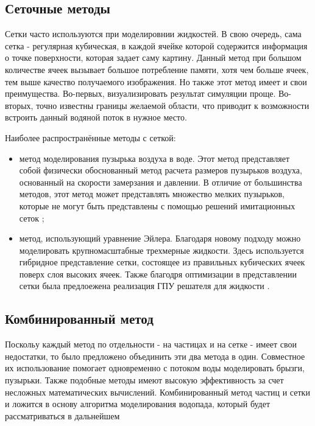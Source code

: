 \subsection{Сеточные методы}

Сетки часто используются при моделировнии жидкостей. В свою очередь, сама сетка - регулярная кубическая, в каждой ячейке которой содержится информация о точке поверхности, которая задает саму картину. Данный метод при большом количестве ячеек вызывает большое потребление памяти, хотя чем больше ячеек, тем выше качество получаемого изображения. Но также этот метод имеет и  свои преимущества. Во-первых, визуализировать результат симуляции проще. Во-вторых, точно известны границы желаемой области, что приводит к возможности встроить данный водяной поток в нужное место.

Наиболее распространённые методы с сеткой:
\begin{itemize}
    \item метод моделирования пузырька воздуха в воде. Этот метод представляет собой физически обоснованный метод расчета размеров пузырьков воздуха, основанный на скорости замерзания и давлении. В отличие от большинства методов, этот метод может представлять множество мелких пузырьков, которые не могут быть представлены с помощью решений имитационных сеток \cite{bubble-grid};

    \item метод, использующий уравнение Эйлера. Благодаря новому подходу можно моделировать крупномасштабные трехмерные жидкости. Здесь используется гибридное представление сетки, состоящее из правильных кубических ячеек поверх слоя высоких ячеек. Также благодря оптимизации в представлении сетки была предлоежена реализация ГПУ решателя для жидкости \cite{eiler-equation-grid}.
\end{itemize}


\subsection{Комбинированный метод}
Поскольу каждый метод по отдельности - на частицах и на сетке - имеет свои недостатки, то было предложено объединить эти два метода в один. Совместное их использование помогает одновременно с потоком воды моделировать брызги, пузырьки. Также подобные методы имеют высокую эффективность за счет несложных математических вычислений. Комбинированный метод частиц и сетки и ложится в основу алгоритма моделирования водопада, который будет рассматриваться в дальнейшем

